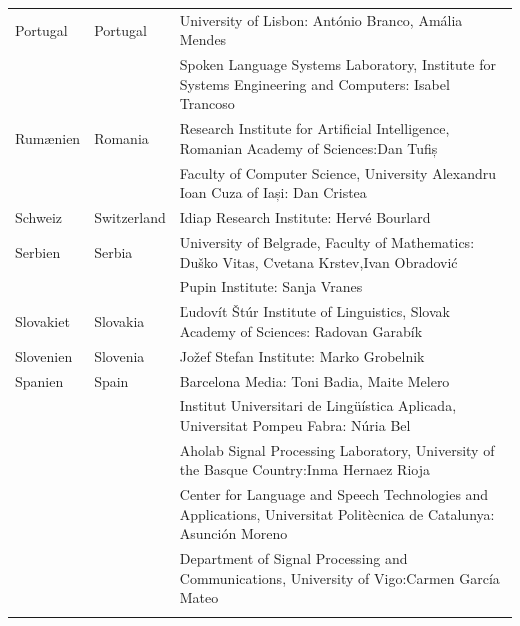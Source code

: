 \begin{longtable}{llp{105mm}}
  Portugal & \textcolor{grey1}{Portugal} & University of Lisbon: António Branco, Amália Mendes \\ \addlinespace
  & & Spoken Language Systems Laboratory, Institute for Systems Engineering and Computers: Isabel Trancoso \\ \addlinespace
  
  Rum\ae nien & \textcolor{grey1}{Romania} & Research Institute for Artificial Intelligence, Romanian Academy of Sciences:\newline Dan Tufiș \\ \addlinespace
  & & Faculty of Computer Science, University Alexandru Ioan Cuza of Iași: Dan Cristea \\ \addlinespace
  
  Schweiz & \textcolor{grey1}{Switzerland} & Idiap Research Institute: Hervé Bourlard \\ \addlinespace 
  
  Serbien & \textcolor{grey1}{Serbia} & University of Belgrade, Faculty of Mathematics: Duško Vitas, Cvetana Krstev,\newline Ivan Obradović \\ \addlinespace
  & & Pupin Institute: Sanja Vranes \\ \addlinespace  
  
  Slovakiet & \textcolor{grey1}{Slovakia} & Ľudovít Štúr Institute of Linguistics, Slovak Academy of Sciences: Radovan Garabík \\ \addlinespace  
  
  Slovenien & \textcolor{grey1}{Slovenia} & Jožef Stefan Institute: Marko Grobelnik \\ \addlinespace  
  
  Spanien & \textcolor{grey1}{Spain} & Barcelona Media: Toni Badia, Maite Melero \\ \addlinespace 
  & & Institut Universitari de Lingüística Aplicada, Universitat Pompeu Fabra: Núria Bel \\ \addlinespace 
  & & Aholab Signal Processing Laboratory, University of the Basque Country:\newline Inma Hernaez Rioja \\ \addlinespace 
  & & Center for Language and Speech Technologies and Applications, Universitat Politècnica de Catalunya:  Asunción Moreno \\ \addlinespace 
  & & Department of Signal Processing and Communications, University of Vigo:\newline Carmen García Mateo \\ \addlinespace
  

\end{longtable}
